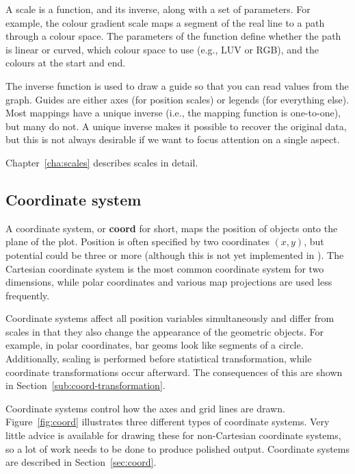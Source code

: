 A scale is a function, and its inverse, along with a set of parameters. For example, the colour gradient scale maps a segment of the real line to a path through a colour space. The parameters of the function define whether the path is linear or curved, which colour space to use (e.g., LUV or RGB), and the colours at the start and end.

The inverse function is used to draw a guide so that you can read values from the graph.  Guides are either axes (for position scales) or legends (for everything else).  Most mappings have a unique inverse (i.e., the mapping function is one-to-one), but many do not.  A unique inverse makes it possible to recover the original data, but this is not always desirable if we want to focus attention on a single aspect.

Chapter~\ref{cha:scales} describes scales in detail.

\subsection{Coordinate system}\label{sec:coordinate_systems}

A coordinate system, or {\bf coord} for short, maps the position of objects onto the plane of the plot. Position is often specified by two coordinates $(x, y)$, but potential could be three or more (although this is not yet implemented in \ggplot). The Cartesian coordinate system is the most common coordinate system for two dimensions, while polar coordinates and various map projections are used less frequently. 

Coordinate systems affect all position variables simultaneously and differ from scales in that they also change the appearance of the geometric objects. For example, in polar coordinates, bar geoms look like segments of a circle. Additionally, scaling is performed before statistical transformation, while coordinate transformations occur afterward. The consequences of this are shown in Section~\ref{sub:coord-transformation}.

Coordinate systems control how the axes and grid lines are drawn.  Figure~\ref{fig:coord} illustrates three different types of coordinate systems.  Very little advice is available for drawing these for non-Cartesian coordinate systems, so a lot of work needs to be done to produce polished output.  Coordinate systems are described in Section~\ref{sec:coord}.

% 



